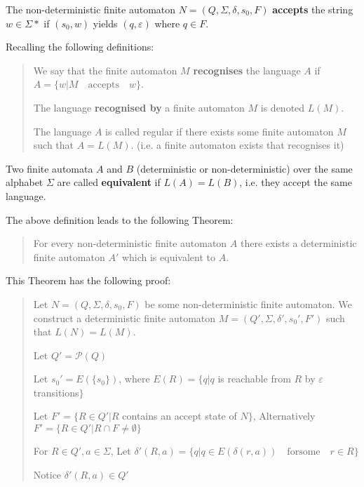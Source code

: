 \documentclass[11pt]{article}
\begin{document}
The non-deterministic finite automaton $N=(Q, \Sigma, \delta, s_0, F)$
\textbf{accepts} the string $w \in \Sigma\ast$ if $(s_0, w)$ yields $(q,
\varepsilon)$ where $q \in F$.

Recalling the following definitions:
\begin{quote}
We say that the finite automaton $M$ \textbf{recognises} the language $A$ if
$A=\{w|M \quad \mathrm{accepts} \quad w\}$.

The language \textbf{recognised by} a finite automaton $M$ is denoted $L(M)$.

The language $A$ is called regular if there exists some finite automaton $M$
such that $A = L(M)$. (i.e. a finite automaton exists that recognises it)
\end{quote}

Two finite automata $A$ and $B$ (deterministic or non-deterministic) over the same
alphabet $\Sigma$ are called \textbf{equivalent} if $L(A)=L(B)$, i.e. they
accept the same language.

The above definition leads to the following Theorem:
\begin{quote}
	For every non-deterministic finite automaton $A$ there exists a deterministic
	finite automaton $A'$ which is equivalent to $A$.
\end{quote}

This Theorem has the following proof:
\begin{quote}
	Let $N=(Q,\Sigma,\delta,s_0,F)$ be some non-deterministic finite automaton. We
	construct a deterministic finite automaton $M=(Q',\Sigma,\delta',s_0',F')$
	such that $L(N) = L(M)$.

	Let $Q'=\mathcal{P}(Q)$

	Let $s_0' = E(\{s_0\})$,
	where $E(R)= \{q|q$ is reachable from $R$ by $\varepsilon$ transitions$\}$

	Let $F'=\{R \in Q'|R$ contains an accept state of $N\}$, Alternatively $F'=\{R
	\in Q'|R \cap F \neq \emptyset\}$

	For $R \in Q', a \in \Sigma$, Let $\delta'(R,a)=\{q|q \in E(\delta(r,a)) \quad
	\mathrm{for some} \quad r \in R\}$

	Notice $\delta'(R,a) \in Q'$
\end{quote}
\end{document}
